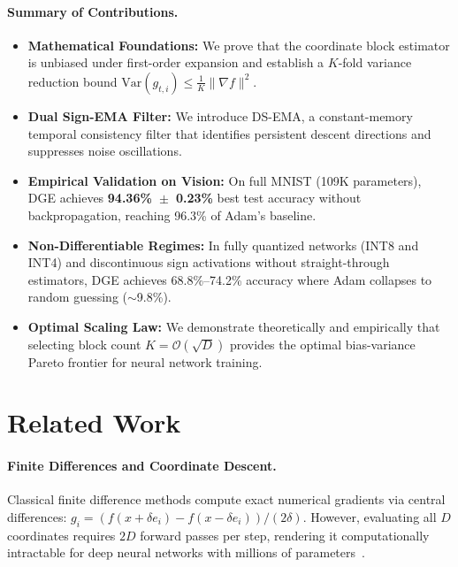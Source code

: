 \documentclass[11pt,a4paper]{article}
\begin{document}
\paragraph{Summary of Contributions.}
\begin{itemize}
    \item \textbf{Mathematical Foundations:} We prove that the coordinate block estimator is unbiased under first-order expansion and establish a $K$-fold variance reduction bound $\text{Var}(g_{t,i}) \leq \frac{1}{K} \|\nabla f\|^2$.
    \item \textbf{Dual Sign-EMA Filter:} We introduce DS-EMA, a constant-memory temporal consistency filter that identifies persistent descent directions and suppresses noise oscillations.
    \item \textbf{Empirical Validation on Vision:} On full MNIST (109K parameters), DGE achieves \textbf{94.36\%~$\pm$~0.23\%} best test accuracy without backpropagation, reaching 96.3\% of Adam's baseline.
    \item \textbf{Non-Differentiable Regimes:} In fully quantized networks (INT8 and INT4) and discontinuous sign activations without straight-through estimators, DGE achieves 68.8\%--74.2\% accuracy where Adam collapses to random guessing ($\sim$9.8\%).
    \item \textbf{Optimal Scaling Law:} We demonstrate theoretically and empirically that selecting block count $K = \mathcal{O}(\sqrt{D})$ provides the optimal bias-variance Pareto frontier for neural network training.
\end{itemize}

\section{Related Work}
\label{sec:related}

\paragraph{Finite Differences and Coordinate Descent.}
Classical finite difference methods compute exact numerical gradients via central differences: $g_i = (f(x + \delta e_i) - f(x - \delta e_i)) / (2\delta)$. However, evaluating all $D$ coordinates requires $2D$ forward passes per step, rendering it computationally intractable for deep neural networks with millions of parameters~\citep{nocedal2006numerical,bertsekas2019nonlinear}.
\end{document}
